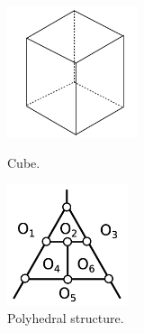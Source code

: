 \documentclass[suppldata, dvipdfmx]{interact}
\theoremstyle{plain}%
\theoremstyle{definition}
\theoremstyle{remark}
\theoremstyle{problemstyle}
\begin{document}
\begin{figure}[h!tbp]
  \begin{minipage}[t]{0.66\textwidth}
 \centering
 \includegraphics[width=1.5in,
 keepaspectratio]{./img/HexahedraWithSphericalFaces/cube.jpg}
 \caption{Cube.}
 \label{fig:cube}
  \end{minipage}
 \hspace*{\fill}
  \begin{minipage}[t]{0.33\textwidth}
   \centering
   \includegraphics[width=1.4in, keepaspectratio]{./img/HexahedraWithSphericalFaces/cube/cubeFaces.jpg}
   \caption{Polyhedral structure.}
   \label{fig:cubePolyhedralStructure}
  \end{minipage}
\end{figure}
\end{document}
